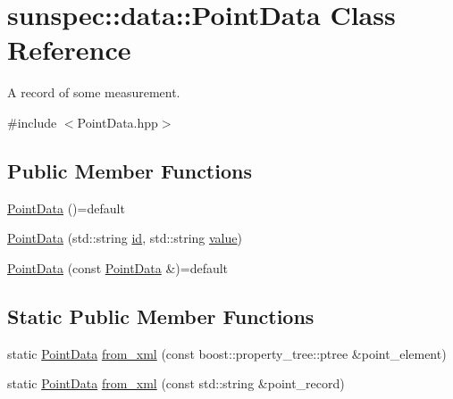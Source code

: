 \hypertarget{structsunspec_1_1data_1_1_point_data}{}\section{sunspec\+:\+:data\+:\+:Point\+Data Class Reference}
\label{structsunspec_1_1data_1_1_point_data}


A record of some measurement.  




{\ttfamily \#include $<$Point\+Data.\+hpp$>$}

\subsection*{Public Member Functions}
\begin{DoxyCompactItemize}
\item 
\hyperlink{structsunspec_1_1data_1_1_point_data_afdea8403454a3ca201ee16396d5ca325}{Point\+Data} ()=default
\item 
\hyperlink{structsunspec_1_1data_1_1_point_data_a8347bc1d6ecb10370320190517a6dde2}{Point\+Data} (std\+::string \hyperlink{structsunspec_1_1data_1_1_point_data_af650254f9eb6b59f4608e69a0470635a}{id}, std\+::string \hyperlink{structsunspec_1_1data_1_1_point_data_a669ad65a5985a90717b48a89bf5efe26}{value})
\item 
\hyperlink{structsunspec_1_1data_1_1_point_data_ae23010639c57a83fa97ea4fce9d5ad95}{Point\+Data} (const \hyperlink{structsunspec_1_1data_1_1_point_data}{Point\+Data} \&)=default
\end{DoxyCompactItemize}
\subsection*{Static Public Member Functions}
\begin{DoxyCompactItemize}
\item 
static \hyperlink{structsunspec_1_1data_1_1_point_data}{Point\+Data} \hyperlink{structsunspec_1_1data_1_1_point_data_a5cd5531342015e5f2a805e6c8ad75a0e}{from\+\_\+xml} (const boost\+::property\+\_\+tree\+::ptree \&point\+\_\+element)
\item 
static \hyperlink{structsunspec_1_1data_1_1_point_data}{Point\+Data} \hyperlink{structsunspec_1_1data_1_1_point_data_a7e37d673b7ae49753deb3734c3716caf}{from\+\_\+xml} (const std\+::string \&point\+\_\+record)
\end{DoxyCompactItemize}
